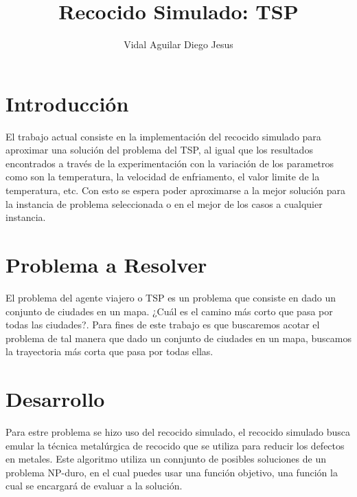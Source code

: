 

\author{Vidal Aguilar Diego Jesus}
\title{Recocido Simulado: TSP}


\titulo

\begin{multicols}{2}



\section{Introducción}

El trabajo actual consiste en la implementación del recocido simulado para aproximar una solución del problema del TSP, al igual que los resultados encontrados a través de la experimentación con la variación de los parametros como son la temperatura, la velocidad de enfriamento, el valor limite de la temperatura, etc. Con esto se espera poder aproximarse a la mejor solución para la instancia de problema seleccionada o en el mejor de los casos a cualquier instancia.

\section{Problema a Resolver}

El problema del agente viajero o TSP es un problema que consiste en dado un conjunto de ciudades en un mapa. ¿Cuál es el camino más corto que pasa por todas las ciudades?. Para fines de este trabajo es que buscaremos acotar el problema de tal manera que dado un conjunto de ciudades en un mapa, buscamos la trayectoria más corta que pasa por todas ellas.

\section{Desarrollo}

Para estre problema se hizo uso del recocido simulado, el recocido simulado busca emular la técnica metalúrgica de recocido que se utiliza para reducir los defectos en metales. Este algoritmo utiliza un connjunto de posibles soluciones de un problema NP-duro, en el cual puedes usar una función objetivo, una función la cual se encargará de evaluar a la solución.


\end{multicols}
